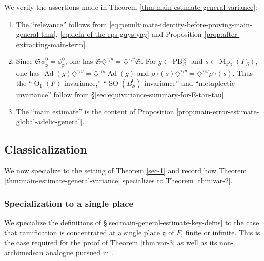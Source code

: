 \documentclass[reqno,10pt]{amsart}
\theoremstyle{plain} %
\theoremstyle{definition}
\theoremstyle{plain} %
\theoremstyle{remark}
\theoremstyle{itplain} %
\theoremstyle{remark} %
\numberwithin{equation}{section}
\DeclareMathOperator{\Mp}{Mp}
\DeclareMathOperator{\SO}{SO}
\DeclareMathOperator{\Ad}{Ad}
\def\PB{\operatorname{PB}}
\def\O{\operatorname{O}}
\begin{document}
We verify the assertions made in Theorem \ref{thm:main-estimate-general-variance}:
\begin{enumerate}
\item The ``relevance'' follows from \eqref{eq:penultimate-identity-before-proving-main-general-thm}, \eqref{eq:defn-of-the-eps-guys-yay} and Proposition \ref{prop:after-extracting-main-term}.
\item Since $\mathfrak{S} \phi_\mathfrak{p}^0 = \phi_\mathfrak{p}^0$, one has $\mathfrak{S} \diamondsuit^{\tau_i y} = \diamondsuit^{\tau_i y} \mathfrak{S}$.  For $g \in \PB^\times_S$ and $s \in \Mp_2(F_S)$, one has $\Ad(g) \diamondsuit^{\tau_i y} = \diamondsuit^{\tau_i y} \Ad(g)$ and $\rho^{\tau_i}(s) \diamondsuit^{\tau_i y} = \diamondsuit^{\tau_i y} \rho^{\tau_i}(s)$.  Thus the ``$\O_1(F)$-invariance,'' ``$\SO(B_S^0)$-invariance'' and ``metaplectic invariance'' follow from \S\ref{sec:equivariance-summary-for-E-tau-tau}.
\item The ``main estimate'' is the content of Proposition \ref{prop:main-error-estimate-global-adelic-general}.
\end{enumerate}


\subsection{Classicalization}
\label{sec-4-4}
We now specialize to the setting of Theorem \ref{sec-1} and record how Theorem \ref{thm:main-estimate-general-variance} specializes to Theorem \ref{thm:var-2}.





\subsubsection{Specialization to a single place\label{sec:general-estimates-specialized-single-place}}
\label{sec-4-4-1}
We specialize the definitions of \S\ref{sec:main-general-estimate-key-defns} to the case that ramification is concentrated at a single place $\mathfrak{q}$ of $F$, finite or infinite.  This is the case required for the proof of Theorem \ref{thm:var-3} as well as its non-archimedean analogue pursued in \cite{nelson-variance-II}.
\end{document}
